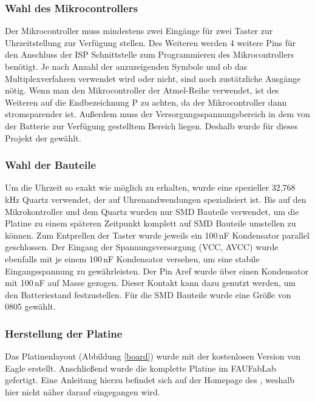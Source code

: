 \subsubsection{Wahl des Mikrocontrollers}
Der Mikrocontroller muss mindestens zwei Eingänge für zwei Taster zur Uhrzeitstellung zur Verfügung stellen. Des Weiteren werden 4 weitere Pins für den Anschluss der ISP Schnittstelle zum Programmieren des Mikrocontrollers benötigt. Je nach Anzahl der anzuzeigenden Symbole und ob das Multiplexverfahren verwendet wird oder nicht,  sind noch zustätzliche Ausgänge nötig. Wenn man den Mikrocontroller der Atmel-Reihe verwendet, ist des Weiteren auf die Endbezeichnung P zu achten, da der Mikrocontroller dann stromsparender ist. Außerdem muss der Versorgungsspannungsbereich in dem von der Batterie zur Verfügung gestelltem Bereich liegen. Deshalb wurde für dieses Projekt der \cite[ATmega88PA]{atmel88pa} gewählt.

\subsubsection{Wahl der Bauteile}
Um die Uhrzeit so exakt wie möglich zu erhalten, wurde eine spezieller 32,768\,kHz Quartz verwendet, der auf Uhrenandwendungen spezialisiert ist. Bis auf den Mikrokontroller und dem Quartz wurden nur SMD Bauteile verwendet, um die Platine zu einem späteren Zeitpunkt komplett auf SMD Bauteile umstellen zu können. Zum Entprellen der Taster wurde jeweils ein 100\,nF Kondensator parallel geschlossen. Der Eingang der Spannungsversorgung (VCC, AVCC) wurde ebenfalls mit je einem 100\,nF Kondensator versehen, um eine stabile Eingangsspannung zu gewährleisten. Der Pin Aref wurde über einen Kondensator mit 100\,nF auf Masse gezogen. Dieser Kontakt kann dazu genutzt werden, um den Batteriestand festzustellen. Für die SMD Bauteile wurde eine Größe von 0805 gewählt.

\subsubsection{Herstellung der Platine}

Das Platinenlayout (Abbildung \ref{board}) wurde mit der kostenlosen Version von Eagle erstellt. Anschließend wurde die komplette Platine im FAUFabLab gefertigt. Eine Anleitung hierzu befindet sich auf der Homepage des \cite[FAUFabLab]{fablabwerkzeuge}, weshalb hier nicht näher darauf eingegangen wird.



